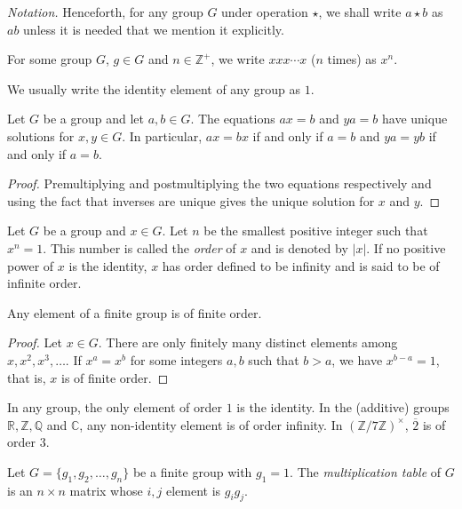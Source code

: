 \textit{Notation.} Henceforth, for any group $G$ under operation $\star$, we shall write $a\star b$ as $ab$ unless it is needed that we mention it explicitly.

For some group $G$, $g\in G$ and $n\in \mathbb{Z}^+$, we write $xxx\cdots x$ ($n$ times) as $x^n$.

We usually write the identity element of any group as $1$.

\begin{theorem}
Let $G$ be a group and let $a,b\in G$. The equations $ax=b$ and $ya=b$ have unique solutions for $x,y\in G$. In particular, $ax=bx$ if and only if $a=b$ and $ya=yb$ if and only if $a=b$.
\end{theorem}
\begin{proof}
Premultiplying and postmultiplying the two equations respectively and using the fact that inverses are unique gives the unique solution for $x$ and $y$.
\end{proof}

\begin{definition}
Let $G$ be a group and $x\in G$. Let $n$ be the smallest positive integer such that $x^n=1$. This number is called the \textit{order} of $x$ and is denoted by $|x|$. If no positive power of $x$ is the identity, $x$ has order defined to be infinity and is said to be of infinite order.
\end{definition}

\begin{theorem}
\label{finGrpFinOrd}
    Any element of a finite group is of finite order.
\end{theorem}
\begin{proof}
    Let $x\in G$. There are only finitely many distinct elements among $x,x^2,x^3,\ldots$. If $x^a=x^b$ for some integers $a,b$ such that $b>a$, we have $x^{b-a}=1$, that is, $x$ is of finite order.
\end{proof}

\begin{example}
In any group, the only element of order $1$ is the identity. In the (additive) groups $\mathbb{R}, \mathbb{Z}, \mathbb{Q}$ and $\mathbb{C}$, any non-identity element is of order infinity. In $(\mathbb{Z}/7\mathbb{Z})^\times$, $\overline{2}$ is of order $3$.
\end{example}

\begin{definition}
Let $G=\{g_1,g_2,\ldots,g_n\}$ be a finite group with $g_1=1$. The \textit{multiplication table} of $G$ is an $n\times n$ matrix whose $i,j$ element is $g_ig_j$.
\end{definition}

